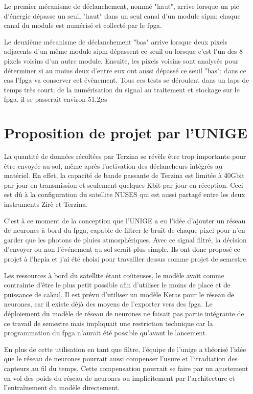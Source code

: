 Le premier mécanisme de déclanchement, nommé "haut", arrive lorsque un pic d'énergie dépasse un seuil "haut" dans un seul canal
d'un module \gls{sipm}; chaque canal du module est numérisé et collecté par le \gls{fpga}. 

Le deuxième mécanisme de déclanchement "bas" arrive lorsque deux pixels adjacents d'un même module \gls{sipm}
dépassent ce seuil ou lorsque c'est l'un des 8 pixels voisins d'un autre module. 
Ensuite, les pixels voisins sont analysés pour déterminer si au moins deux d'entre eux ont aussi dépassé ce seuil "bas"; dans ce cas l'\gls{fpga} va conserver cet évènement.
Tous ces tests se déroulent dans un laps de temps très court; de la numérisation du signal au traitement et stockage sur le \gls{fpga}, il se passerait environ 51.2$\mu$s

\section{Proposition de projet par l'UNIGE}

La quantité de données récoltées par Terzina se révèle être trop importante pour être envoyée au sol, même après l'activation des déclancheurs intégrés au matériel.
En effet, la capacité de bande passante de Terzina est limitée à 40Gbit par jour en transmission et seulement quelques Kbit par jour en réception.
Ceci est dû à la configuration du satellite NUSES qui est aussi partagé entre les deux instruments Zirè et Terzina.

C'est à ce moment de la conception que l'UNIGE a eu l'idée d'ajouter un réseau de neurones à bord du \gls{fpga}, capable de filtrer
le bruit de chaque pixel pour n'en garder que les photons de pluies atmosphériques. 
Avec ce signal filtré, la décision d'envoyer ou non l'événement au sol serait plus simple. 
Ils ont donc proposé ce projet à l'\gls{hepia} et j'ai été choisi pour travailler dessus comme projet de semestre.

Les ressources à bord du satellite étant coûteuses, le modèle avait comme contrainte d'être le plus petit possible 
afin d'utiliser le moins de place et de puissance de calcul.
Il est prévu d'utiliser un modèle Keras pour le réseau de neurones, car il existe déjà des moyens de l'exporter vers des \gls{fpga}.
Le déploiement du modèle de réseau de neurones ne faisait pas partie intégrante de ce travail de semestre mais impliquait une
restriction technique car la programmation du \gls{fpga} n'aurait été possible qu'avant le lancement.

En plus de cette utilisation en tant que filtre, l'équipe de l'\gls{unige} a théorisé l'idée que le réseau de neurones
pourrait aussi compenser l'usure et l'irradiation des capteurs au fil du temps. Cette compensation pourrait se faire par un ajustement en vol 
des poids du réseau de neurones ou implicitement par l'architecture et l'entraînement du modèle directement.

